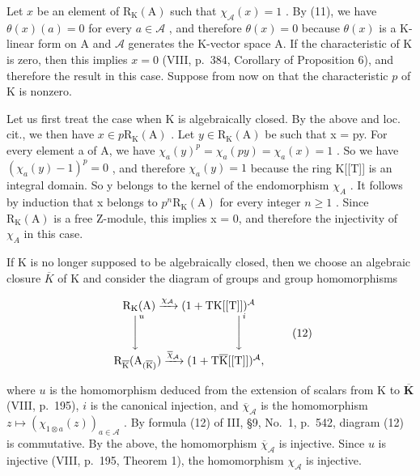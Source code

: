 Let \(x\) be an element of \(\mathrm{R}_{\mathrm{K}}(\mathrm{A})\) such that \(\chi_{\mathcal{A}}(x) = 1\) . By (11), we have \(\theta(x)(a) = 0\) for every \(a \in \mathcal{A}\) , and therefore \(\theta(x) = 0\) because \(\theta(x)\) is a K-linear form on A and \(\mathcal{A}\) generates the K-vector space A. If the characteristic of K is zero, then this implies \(x = 0\) (VIII, p.~384, Corollary of Proposition 6), and therefore the result in this case. Suppose from now on that the characteristic \(p\) of K is nonzero.

Let us first treat the case when K is algebraically closed. By the above and loc. cit., we then have \(x \in p \mathrm{R}_{\mathrm{K}}(\mathrm{A})\) . Let \(y \in \mathrm{R}_{\mathrm{K}}(\mathrm{A})\) be such that x = py. For every element a of A, we have \(\chi_{a}(y)^{p} = \chi_{a}(py) = \chi_{a}(x) = 1\) . So we have \((\chi_{a}(y) - 1)^{p} = 0\) , and therefore \(\chi_{a}(y) = 1\) because the ring K{[}{[}T{]}{]} is an integral domain. So y belongs to the kernel of the endomorphism \(\chi_{A}\) . It follows by induction that x belongs to \(p^{n}\mathrm{R}_{\mathrm{K}}(\mathrm{A})\) for every integer \(n \geqslant 1\) . Since \(\mathrm{R}_{\mathrm{K}}(\mathrm{A})\) is a free Z-module, this implies x = 0, and therefore the injectivity of \(\chi_{A}\) in this case.

If K is no longer supposed to be algebraically closed, then we choose an algebraic closure \(\overline{K}\) of K and consider the diagram of groups and group homomorphisms

\[
\begin{array}{c} \mathrm{R} _ {\mathrm{K}} (\mathrm{A}) \xrightarrow {\chi_ {\mathcal {A}}} (1 + \mathrm{TK} [ [ \mathrm{T} ] ]) ^ {\mathcal {A}} \\ \Biggl \downarrow^ {u} \qquad \qquad \qquad \qquad \Biggl \downarrow^ {i} \\ \mathrm{R} _ {\overline {{\mathrm{K}}}} (\mathrm{A} _ {(\overline {{\mathrm{K}}})}) \xrightarrow {\overline {{\chi}} _ {\mathcal {A}}} (1 + \mathrm{T} \overline {{\mathrm{K}}} [ [ \mathrm{T} ] ]) ^ {\mathcal {A}}, \end{array}\tag{12}
\]

where \(u\) is the homomorphism deduced from the extension of scalars from K to \(\overline{\mathbf{K}}\) (VIII, p.~195), \(i\) is the canonical injection, and \(\overline{\chi}_{\mathcal{A}}\) is the homomorphism \(z \mapsto (\chi_{1 \otimes a}(z))_{a \in \mathcal{A}}\) . By formula (12) of III, §9, No.~1, p.~542, diagram (12) is commutative. By the above, the homomorphism \(\overline{\chi}_{\mathcal{A}}\) is injective. Since \(u\) is injective (VIII, p.~195, Theorem 1), the homomorphism \(\chi_{\mathcal{A}}\) is injective.

